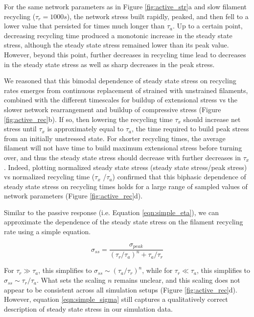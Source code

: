 \documentclass[10pt,letterpaper]{article}
\begin{document}
For the same network parameters as in Figure \ref{fig:active_str}a and slow filament recycling ($\tau_r = 1000 s$), the network stress built rapidly, peaked, and then fell to a lower value that persisted for times much longer than $\tau_a$. Up to a certain point, decreasing recycling time produced a monotonic increase in the steady state stress, although the steady state stress remained lower than its peak value. However, beyond this point, further decreases in recycling time lead to decreases in the steady state stress as well as sharp decreases in the peak stress. 

We reasoned that this bimodal dependence of steady state stress on recycling rates emerges from continuous replacement of strained with unstrained filaments, combined with the different timescales for buildup of extensional stress vs the slower network rearrangement and buildup of compressive  stress (Figure \ref{fig:active_rec}b). If so, then lowering the recycling time $\tau_x$ should increase net stress until $\tau_x$ is approximately equal to $\tau_a$, the time required to build peak stress from an initially unstressed state. For shorter recycling times, the average filament will not have time to build maximum extensional stress before turning over, and thus the steady state stress should decrease with further decreases in $\tau_x$. Indeed, plotting normalized steady state stress (steady state stress/peak stress) vs normalized recycling time ($\tau_x$ /$\tau_a$) confirmed that this biphasic dependence of steady state stress on recycling times holds for a large range of sampled values of network parameters (Figure \ref{fig:active_rec}d).


Similar to the passive response (i.e. Equation \ref{eqn:simple_eta}), we can approximate the dependence of the steady state stress on the filament recycling rate using a simple equation. 

\begin{equation}
\label{eqn:simple_sigma}
\sigma_{ss} = \frac{\sigma_{peak}}{(\tau_r/\tau_a)^n+\tau_a/\tau_r}  
\end{equation}

For $\tau_r\gg\tau_a$, this simplifies to $\sigma_{ss}\sim(\tau_a/\tau_r)^n$, while for $\tau_r\ll\tau_a$, this simplifies to $\sigma_{ss}\sim\tau_r/\tau_a$. What sets the scaling $n$ remains unclear, and this scaling does not appear to be consistent across all simulation setups (Figure \ref{fig:active_rec}d). However, equation \ref{eqn:simple_sigma} still captures a qualitatively correct description of steady state stress in our simulation data.
\end{document}
